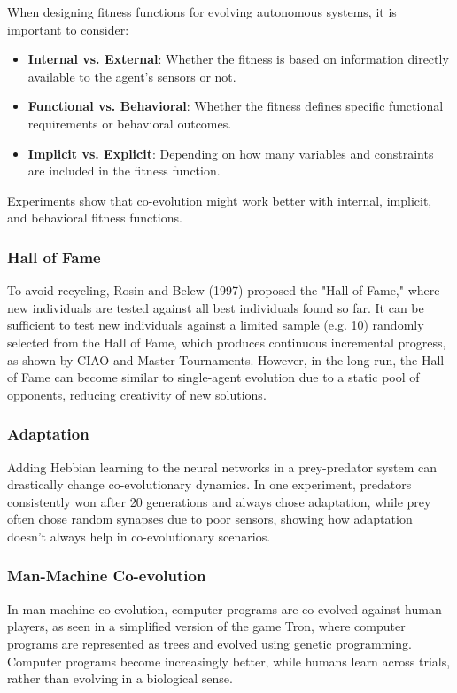 When designing fitness functions for evolving autonomous systems, it is important to consider:
\begin{itemize}
    \item \textbf{Internal vs. External}: Whether the fitness is based on information directly available to the agent's sensors or not.
    \item \textbf{Functional vs. Behavioral}: Whether the fitness defines specific functional requirements or behavioral outcomes.
    \item \textbf{Implicit vs. Explicit}: Depending on how many variables and constraints are included in the fitness function.
\end{itemize}
Experiments show that co-evolution might work better with internal, implicit, and behavioral fitness functions.

\subsubsection*{Hall of Fame}

To avoid recycling, Rosin and Belew (1997) proposed the "Hall of Fame," where new individuals are tested against all best individuals found so far.  It can be sufficient to test new individuals against a limited sample (e.g. 10) randomly selected from the Hall of Fame, which produces continuous incremental progress, as shown by CIAO and Master Tournaments. However, in the long run, the Hall of Fame can become similar to single-agent evolution due to a static pool of opponents, reducing creativity of new solutions.

\subsubsection*{Adaptation}
Adding Hebbian learning to the neural networks in a prey-predator system can drastically change co-evolutionary dynamics.  In one experiment, predators consistently won after 20 generations and always chose adaptation, while prey often chose random synapses due to poor sensors, showing how adaptation doesn't always help in co-evolutionary scenarios.

\subsubsection*{Man-Machine Co-evolution}
In man-machine co-evolution, computer programs are co-evolved against human players, as seen in a simplified version of the game Tron, where computer programs are represented as trees and evolved using genetic programming.  Computer programs become increasingly better, while humans learn across trials, rather than evolving in a biological sense.

